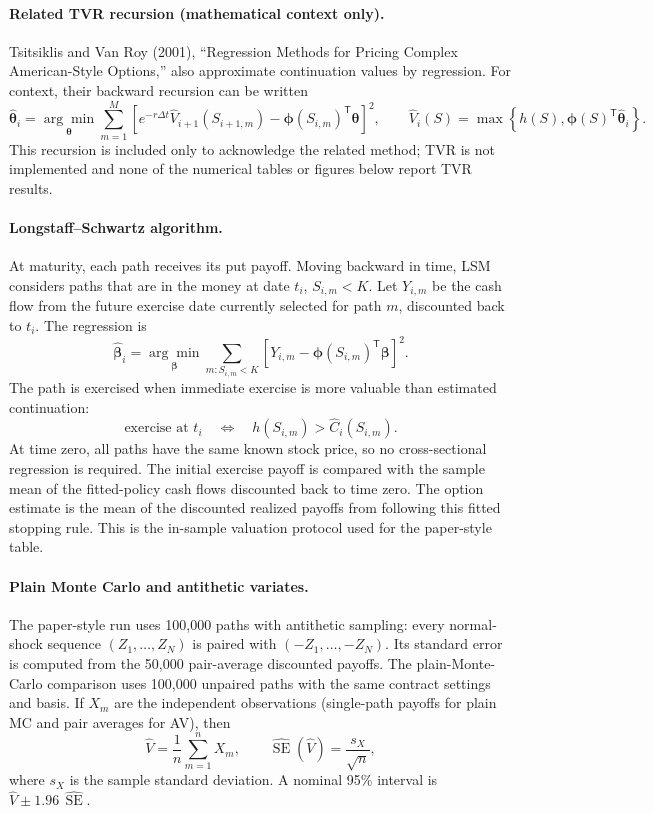 \paragraph{Related TVR recursion (mathematical context only).}
Tsitsiklis and Van Roy (2001), ``Regression Methods for Pricing Complex
American-Style Options,'' also approximate continuation values by regression.
For context, their backward recursion can be written
\[
    \widehat{\boldsymbol\theta}_i
    =\underset{\boldsymbol\theta}{\arg\min}
      \sum_{m=1}^{M}
      \left[
        e^{-r\Delta t}\widehat V_{i+1}(S_{i+1,m})
        -\boldsymbol{\phi}(S_{i,m})^{\mathsf T}\boldsymbol\theta
      \right]^2,
    \qquad
    \widehat V_i(S)
    =\max\!\left\{h(S),
      \boldsymbol{\phi}(S)^{\mathsf T}\widehat{\boldsymbol\theta}_i
      \right\}.
\]
This recursion is included only to acknowledge the related method; TVR is
not implemented and none of the numerical tables or figures below report
TVR results.

\paragraph{Longstaff--Schwartz algorithm.}
At maturity, each path receives its put payoff. Moving backward in time,
LSM considers paths that are in the money at date \(t_i\),
\(S_{i,m}<K\). Let \(Y_{i,m}\) be the cash flow from the future exercise
date currently selected for path \(m\), discounted back to \(t_i\). The
regression is
\[
    \widehat{\boldsymbol\beta}_i
    =
    \underset{\boldsymbol\beta}{\arg\min}
    \sum_{m:S_{i,m}<K}
    \left[
        Y_{i,m}
        -\boldsymbol{\phi}(S_{i,m})^{\mathsf T}\boldsymbol\beta
    \right]^2.
\]
The path is exercised when immediate exercise is more valuable than
estimated continuation:
\[
    \text{exercise at }t_i
    \quad\Longleftrightarrow\quad
    h(S_{i,m})>\widehat C_i(S_{i,m}).
\]
At time zero, all paths have the same known stock price, so no cross-sectional
regression is required. The initial exercise payoff is compared with the
sample mean of the fitted-policy cash flows discounted back to time zero.
The option estimate is the mean of the discounted realized payoffs from
following this fitted stopping rule. This is the in-sample valuation
protocol used for the paper-style table.

\paragraph{Plain Monte Carlo and antithetic variates.}
The paper-style run uses 100,000 paths with antithetic sampling: every
normal-shock sequence \((Z_1,\ldots,Z_N)\) is paired with
\((-Z_1,\ldots,-Z_N)\). Its standard error is computed from the 50,000
pair-average discounted payoffs. The plain-Monte-Carlo comparison uses
100,000 unpaired paths with the same contract settings and basis. If
\(X_m\) are the independent observations (single-path payoffs for plain
MC and pair averages for AV), then
\[
    \widehat V=\frac{1}{n}\sum_{m=1}^{n}X_m,\qquad
    \widehat{\operatorname{SE}}(\widehat V)
    =\frac{s_X}{\sqrt{n}},
\]
where \(s_X\) is the sample standard deviation. A nominal 95\% interval
is \(\widehat V\pm1.96\,\widehat{\operatorname{SE}}\).

